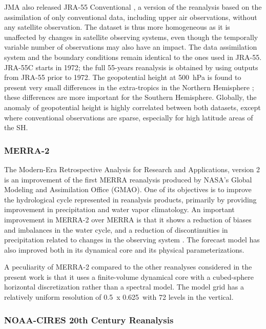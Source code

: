 \documentclass{ametsoc}
\begin{document}
	JMA also released JRA-55 Conventional \citep[JRA-55C --][]{Kobayashi2014}, a version of the reanalysis based on the assimilation of only conventional data, including upper air observations, without any satellite observation. The dataset is thus more homogeneous as it is unaffected by changes in satellite observing systems, even though the temporally variable number of observations may also have an impact. The data assimilation system and the boundary conditions remain identical to the ones used in JRA-55. JRA-55C starts in 1972; the full 55-years reanalysis is obtained by using outputs from JRA-55 prior to 1972. The geopotential height at 500~hPa is found to present very small differences in the extra-tropics in the Northern Hemisphere \citep{Kobayashi2014}; these differences are more important for the Southern Hemisphere. Globally, the anomaly of geopotential height is highly correlated between both datasets, except where conventional observations are sparse, especially for high latitude areas of the SH.
	
	
	\subsubsection{MERRA-2}
	
	The Modern-Era Retrospective Analysis for Research and Applications, version 2 \citep[MERRA-2 -- ][]{Gelaro2017} is an improvement of the first MERRA reanalysis \citep{Rienecker2011} produced by NASA's Global Modeling and Assimilation Office (GMAO). One of its objectives is to improve the hydrological cycle represented in reanalysis products, primarily by providing improvement in precipitation and water vapor climatology. An important improvement in MERRA-2 over MERRA is that it shows a reduction of biases and imbalances in the water cycle, and a reduction of discontinuities in precipitation related to changes in the observing system \citep{Gelaro2017}. The forecast model has also improved both in its dynamical core and its physical parameterizations.
	
	A peculiarity of MERRA-2 compared to the other reanalyses considered in the present work is that it uses a finite-volume dynamical core with a cubed-sphere horizontal discretization rather than a spectral model. The model grid has a relatively uniform resolution of 0.5\degree\ x 0.625\degree\ with 72 levels in the vertical.
	
	
	\subsubsection{NOAA-CIRES 20th Century Reanalysis}
	
\end{document}

